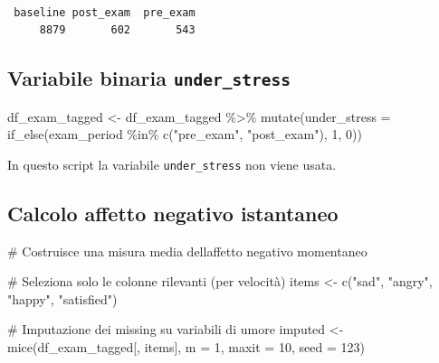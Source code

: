 \documentclass[
  11pt,
  a4paper,
  onecolumn]{article}
\newenvironment{Shaded}{}{}
\newcommand{\AttributeTok}[1]{\textcolor[rgb]{0.84,0.23,0.29}{#1}}
\newcommand{\CommentTok}[1]{\textcolor[rgb]{0.42,0.45,0.49}{#1}}
\newcommand{\DecValTok}[1]{\textcolor[rgb]{0.00,0.36,0.77}{#1}}
\newcommand{\FunctionTok}[1]{\textcolor[rgb]{0.44,0.26,0.76}{#1}}
\newcommand{\NormalTok}[1]{\textcolor[rgb]{0.14,0.16,0.18}{#1}}
\newcommand{\OtherTok}[1]{\textcolor[rgb]{0.44,0.26,0.76}{#1}}
\newcommand{\SpecialCharTok}[1]{\textcolor[rgb]{0.00,0.36,0.77}{#1}}
\newcommand{\StringTok}[1]{\textcolor[rgb]{0.01,0.18,0.38}{#1}}
\begin{document}
\begin{Shaded}
\end{Shaded}

\begin{verbatim}

 baseline post_exam  pre_exam 
     8879       602       543 
\end{verbatim}

\subsection{\texorpdfstring{Variabile binaria
\texttt{under\_stress}}{Variabile binaria under\_stress}}\label{variabile-binaria-under_stress}

\begin{Shaded}
\begin{Highlighting}[]
\NormalTok{df\_exam\_tagged }\OtherTok{\textless{}{-}}\NormalTok{ df\_exam\_tagged }\SpecialCharTok{\%\textgreater{}\%}
  \FunctionTok{mutate}\NormalTok{(}\AttributeTok{under\_stress =} \FunctionTok{if\_else}\NormalTok{(exam\_period }\SpecialCharTok{\%in\%} \FunctionTok{c}\NormalTok{(}\StringTok{"pre\_exam"}\NormalTok{, }\StringTok{"post\_exam"}\NormalTok{), }\DecValTok{1}\NormalTok{, }\DecValTok{0}\NormalTok{))}
\end{Highlighting}
\end{Shaded}

In questo script la variabile \texttt{under\_stress} non viene usata.

\subsection{Calcolo affetto negativo
istantaneo}\label{calcolo-affetto-negativo-istantaneo}

\begin{Shaded}
\begin{Highlighting}[]
\CommentTok{\# Costruisce una misura media dell\textquotesingle{}affetto negativo momentaneo}

\CommentTok{\# Seleziona solo le colonne rilevanti (per velocità)}
\NormalTok{items }\OtherTok{\textless{}{-}} \FunctionTok{c}\NormalTok{(}\StringTok{"sad"}\NormalTok{, }\StringTok{"angry"}\NormalTok{, }\StringTok{"happy"}\NormalTok{, }\StringTok{"satisfied"}\NormalTok{)}

\CommentTok{\# Imputazione dei missing su variabili di umore}
\NormalTok{imputed }\OtherTok{\textless{}{-}} \FunctionTok{mice}\NormalTok{(df\_exam\_tagged[, items], }\AttributeTok{m =} \DecValTok{1}\NormalTok{, }\AttributeTok{maxit =} \DecValTok{10}\NormalTok{, }\AttributeTok{seed =} \DecValTok{123}\NormalTok{)}
\end{Highlighting}
\end{Shaded}
\end{document}
